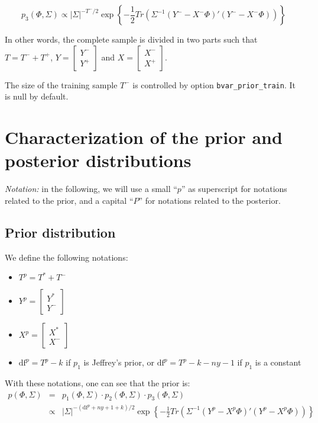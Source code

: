 \documentclass[10pt,a4paper]{article}
\newcommand{\df}{\text{df}}
\begin{document}
$$p_3(\Phi, \Sigma) \propto |\Sigma|^{-T^-/2} \exp\left\{-\frac{1}{2}Tr(\Sigma^{-1}(Y^--X^-\Phi)'(Y^--X^-\Phi))\right\}$$

In other words, the complete sample is divided in two parts such that $T = T^- + T^+$,
$Y = \left[
\begin{array}{c}
Y^- \\
Y^+
\end{array}
\right]$ and
$X = \left[
\begin{array}{c}
X^- \\
X^+
\end{array}
\right]$.

The size of the training sample $T^-$ is controlled by option \texttt{bvar\_prior\_train}. It is null by default.

\section{Characterization of the prior and posterior distributions}

\textit{Notation:} in the following, we will use a small ``$p$'' as superscript for notations related to the prior, and a capital ``$P$'' for notations related to the posterior.

\subsection{Prior distribution}
\label{prior-distrib}

We define the following notations:
\begin{itemize}
\item $T^p = T^* + T^-$
\item
$Y^p = \left[
\begin{array}{c}
Y^* \\
Y^-
\end{array}
\right]$
\item
$X^p = \left[
\begin{array}{c}
X^* \\
X^-
\end{array}
\right]$
\item $\df^p = T^p - k$ if $p_1$ is Jeffrey's prior, or $\df^p = T^p - k - ny - 1$ if $p_1$ is a constant
\end{itemize}

With these notations, one can see that the prior is:
\begin{eqnarray*}
p(\Phi, \Sigma) & = & p_1(\Phi, \Sigma)\cdot p_2(\Phi, \Sigma)\cdot p_3(\Phi, \Sigma) \\
& \propto & |\Sigma|^{-(\df^p + ny + 1 + k)/2} \exp\left\{-\frac{1}{2}Tr(\Sigma^{-1}(Y^p-X^p\Phi)'(Y^p-X^p\Phi))\right\}
\end{eqnarray*}
\end{document}
